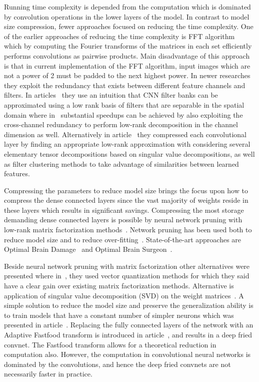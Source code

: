 \documentclass{article} %
\begin{document}
Running time complexity is depended from the computation which is dominated by 
convolution operations in the lower layers of the model. In contrast to model 
size compression, fewer approaches focused on reducing the time complexity. One 
of the earlier approaches of reducing the 
time complexity is FFT algorithm~\cite{mathieu2013fast} which by computing the 
Fourier transforms of the matrices in each set efficiently performs convolutions 
as pairwise products. Main disadvantage of this approach is that in current 
implementation of the FFT algorithm, input images which
are not a power of 2 must be padded to the next highest power. In newer 
researches they exploit the redundancy 
that exists between different feature channels and filters. In 
articles~\cite{jaderberg2014speeding, rigamonti2013learning} they use an
intuition that CNN filter banks can be approximated using a low rank basis of
filters that are separable in the spatial domain where 
in~\cite{jaderberg2014speeding}
substantial speedups can be achieved by also exploiting the cross-channel 
redundancy to perform low-rank decomposition in the
channel dimension as well. Alternatively in article~\cite{denton2014exploiting} 
they compressed each 
convolutional layer by finding an appropriate low-rank approximation with 
considering several elementary tensor decompositions based on singular value 
decompositions, as well as filter clustering methods to take advantage of 
similarities between learned features.


Compressing the parameters to reduce model size brings the focus upon how to 
compress the dense connected layers since the vast majority of weights reside in 
these layers which results in significant savings. Compressing the most storage 
demanding dense connected layers is possible by neural network pruning with 
low-rank matrix factorization methods~\cite{bondarenko2014artificial, 
schmidhuber2015deep, sainath2013low}. Network pruning has been used both to 
reduce model size and to reduce over-fitting~\cite{han2015learning}. 
State-of-the-art approaches are Optimal Brain Damage~\cite{lecun1989optimal} and 
Optimal Brain Surgeon~\cite{hassibi1993optimal}. 

Beside neural network pruning 
with matrix factorization other alternatives were presented where 
in~\cite{DBLP:journals/corr/GongLYB14}, they used vector quantization methods 
for which 
they said have a clear gain over existing matrix factorization methods. 
Alternative is application of singular value decomposition (SVD) on the weight 
matrices~\cite{xue2013restructuring}. A simple solution to reduce the model size 
and preserve the generalization ability is to train models that have a constant 
number of simpler neurons which was presented in 
article~\cite{collins2014memory}.
Replacing  the fully connected layers of the network with an Adaptive Fastfood 
transform is introduced in article~\cite{yang2014deep}, and results 
in a deep fried convnet. The Fastfood transform allows for a theoretical 
reduction in computation also. However, the computation in convolutional neural 
networks is dominated by the convolutions, and hence the deep fried convnets are 
not necessarily faster in practice.
\end{document}
